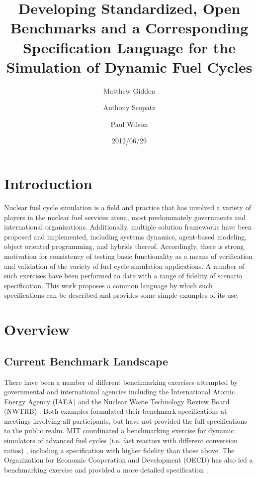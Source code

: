 \documentclass{anstrans}
\title{Developing Standardized, Open Benchmarks and a Corresponding 
Specification Language for the Simulation of Dynamic Fuel Cycles}
\author[*]{Matthew Gidden}
\author[$\dag$]{Anthony Scopatz}
\author[*]{Paul Wilson}
\affil[*]{Department of Nuclear Engineering \& Engineering Physics, 
University of Wisconsin - Madison, Madison, WI, 53703}
\affil[$\dag$]{The Flash Center for Computational Science, University 
of Chicago, Chicago, IL, 60637}
\date{2012/06/29}
\begin{document}
\section{Introduction}
Nuclear fuel cycle simulation is a field and practice that has involved a
variety of players in the nuclear fuel services arena, most predominately
governments and international organizations.  Additionally, multiple solution
frameworks have been proposed and implemented, including systems dynamics,
agent-based modeling, object oriented programming, and hybrids
thereof. Accordingly, there is strong motivation for consistency of testing
basic functionality as a means of verification and validation of the variety of
fuel cycle simulation applications. A number of such exercises have been
performed to date with a range of fidelity of scenario specification. This work
proposes a common language by which such specifications can be described and
provides some simple examples of its use.

\section{Overview}

\subsection{Current Benchmark Landscape}
There have been a number of different benchmarking exercises attempted by
governmental and international agencies including the International Atomic
Energy Agency (IAEA) \cite{_international_2011} and the Nuclear Waste Technology
Review Board (NWTRB) \cite{_nuclear_2011}.  Both examples formulated their
benchmark specifications at meetings involving all participants, but have not
provided the full specifications to the public realm. MIT coordinated a
benchmarking exercise for dynamic simulators of advanced fuel cycles (i.e. fast
reactors with different conversion ratios) \cite{guerin_benchmark_2009},
including a specification with higher fidelity than those above. The
Organization for Economic Cooperation and Development (OECD) has also led a
benchmarking exercise \cite{boucher_benchmark_2012} and provided a more detailed
specification \cite{boucher_specification_2008}. 

\end{document}
